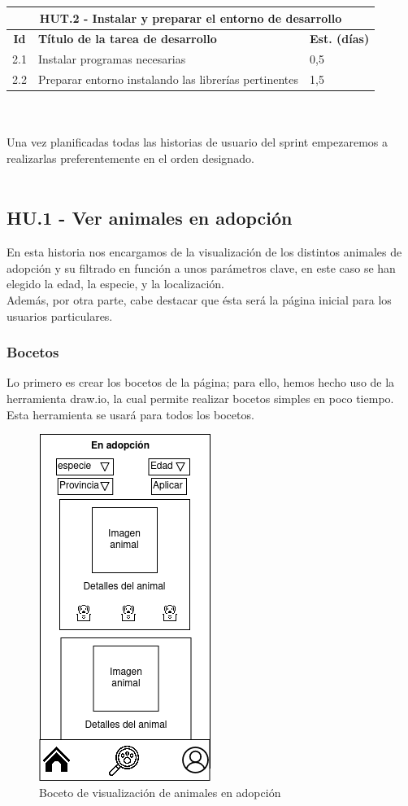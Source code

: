 \begin{tabular}{|c|p{9.5cm}|p{1cm}|}
	\hline
	\multicolumn{3}{|c|}{\textbf{HUT.2 - Instalar y preparar el entorno de desarrollo}} \\
	\hline
	\textbf{Id} & \textbf{Título de la tarea de desarrollo} & \textbf{Est. (días)} \\
	\hline
	2.1 & Instalar programas necesarias & 0,5 \\ \hline
	2.2 & Preparar entorno instalando las librerías pertinentes & 1,5 \\ \hline
\end{tabular} \\ \\


Una vez planificadas todas las historias de usuario del sprint empezaremos a realizarlas preferentemente en el orden designado. \\ \\

\subsection{HU.1 - Ver animales en adopción}

En esta historia nos encargamos de la visualización de los distintos animales de adopción y su filtrado en función a unos parámetros clave, en este caso se han elegido la edad, la especie, y la localización. \\

Además, por otra parte, cabe destacar que ésta será la página inicial para los usuarios particulares. \\ 

\subsubsection{Bocetos}

Lo primero es crear los bocetos de la página; para ello, hemos hecho uso de la herramienta draw.io, la cual permite realizar bocetos simples en poco tiempo. Esta herramienta se usará para todos los bocetos.

\begin{figure}[H]
	\centering
	\includegraphics[width=0.31\linewidth]{"bocetos/iteracion 1/adopciones"}
	\caption{Boceto de visualización de animales en adopción}
	\label{fig:adopciones}
\end{figure}

